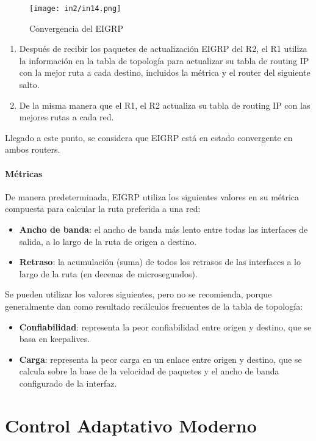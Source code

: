 \documentclass[
	12pt, %
	fleqn, %
	a4paper, %
	oneside, %
]{LegrandOrangeBook}
\begin{document}
\begin{figure}[H]
\centering
\texttt{[image: in2/in14.png]}
\caption{Convergencia del EIGRP}
\end{figure}
\begin{enumerate}
\item Después de recibir los paquetes de actualización EIGRP del R2, el R1 utiliza la información en la tabla de topología para actualizar su tabla de routing IP con la mejor ruta a cada destino, incluidos la métrica y el router del siguiente salto.
\item De la misma manera que el R1, el R2 actualiza su tabla de routing IP con las mejores rutas a cada red.
\end{enumerate}
Llegado a este punto, se considera que EIGRP está en estado convergente en ambos routers.
\subsection{Métricas}
De manera predeterminada, EIGRP utiliza los siguientes valores en su métrica compuesta para calcular la ruta preferida a una red:
\begin{itemize}
\item \textbf{Ancho de banda}: el ancho de banda más lento entre todas las interfaces de salida, a lo largo de la ruta de origen a destino.
\item \textbf{Retraso}: la acumulación (suma) de todos los retrasos de las interfaces a lo largo de la ruta (en decenas de microsegundos).
\end{itemize}
Se pueden utilizar los valores siguientes, pero no se recomienda, porque generalmente dan como resultado recálculos frecuentes de la tabla de topología:
\begin{itemize}
\item \textbf{Confiabilidad}: representa la peor confiabilidad entre origen y destino, que se basa en keepalives.
\item \textbf{Carga}: representa la peor carga en un enlace entre origen y destino, que se calcula sobre la base de la velocidad de paquetes y el ancho de banda configurado de la interfaz.
\end{itemize}
\part{Control Adaptativo Moderno}
\end{document}
